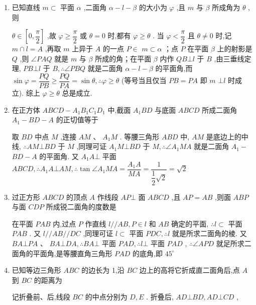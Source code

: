 \begin{enumerate}
    \item 已知直线 $m \subset$ 平面 $\alpha$ ,二面角 $\alpha  - l - \beta$ 的大小为 $\varphi$ ,且 $m$ 与 $\beta$ 所成角为 $\theta$ ,则
    \begin{jieda}
        $\theta  \in  \left\lbrack  {0,\dfrac{\pi }{2}}\right\rbrack$ ,故 $\varphi  \geq  \dfrac{\pi }{2}$ 或 $\theta  = 0$ 时,都有 $\varphi  \geq  \theta$ . 当 $\varphi  < \dfrac{\pi }{2}$ 且 $\theta  \neq  0$ 时,记 $m \cap  l = A$ ,再取 $m$ 上异于 $A$ 的一点 $P \in$  $m \subset  \alpha$ ；点 $P$ 在平面 $\beta$ 上的射影是 $Q$ ,则 $\angle {PAQ}$ 就是 $m$ 与 $\beta$ 所成的角；在平面 $\beta$ 内作 ${QB}\bot l$ 于 $B$ ,由三垂线定理, ${PB}\bot l$ 于 $B,\therefore \angle {PBQ}$ 就是二面角 $\alpha  - l - \beta$ 的平面角,而 $\sin \varphi  = \dfrac{PQ}{PB} \geq  \dfrac{PQ}{PA} = \sin \theta ,\therefore \varphi  \geq  \theta$ (等号当且仅当 ${PB} = {PA}$ 即 $m$  $\bot  l$ 时成立). 综上 $\varphi  \geq  \theta$ 总是成立.
    \end{jieda}
    \item 在正方体 ${ABCD} - {A}_{1}{B}_{1}{C}_{1}{D}_{1}$ 中,截面 ${A}_{1}{BD}$ 与底面 ${ABCD}$ 所成二面角 ${A}_{1} - {BD} - A$ 的正切值等于
    \begin{jieda}
        取 ${BD}$ 中点 $M$ ,连接 ${AM}\text{ 、 }{A}_{1}M$ . 等腰三角形 ${ABD}$ 中, ${AM}$ 是底边上的中线, $\therefore {AM}\bot {BD}$ 于 $M$ ,同理可证 ${A}_{1}M\bot {BD}$ 于 $M,\therefore \angle {A}_{1}{MA}$ 就是二面角 ${A}_{1} -$  ${BD} - A$ 的平面角. 又 ${A}_{1}A \bot$ 平面 ${ABCD},\therefore {A}_{1}A \bot  {AM},\therefore \tan \angle {A}_{1}{MA} = \dfrac{{A}_{1}A}{MA} = \dfrac{1}{\dfrac{1}{2}\sqrt{2}} = \sqrt{2}$
    \end{jieda}
    \item 过正方形 ${ABCD}$ 的顶点 $A$ 作线段 ${AP} \bot$ 面 ${ABCD}$ ,且 ${AP} = {AB}$ ,则面 ${ABP}$ 与面 ${CDP}$ 所成锐二面角的度数是
    \begin{jieda}
        在平面 ${PAB}$ 内,过点 $P$ 作直线 $l//{AB},P \in  l$ 和 ${AB}$ 确定的平面, $\therefore l \subset$ 平面 ${PAB}$ . 又 $l//{AB}//{DC}$ ,同理可证 $l \subset$ 平面 ${PDC},\therefore l$ 就是所求二面角的棱. 又 ${BA} \bot  {PA}\text{ 、 }{BA} \bot  {DA},\therefore {BA} \bot$ 平面 ${PAD},\therefore l \bot$ 平面 ${PAD}$ , $\therefore \angle {APD}$ 就足所求二面角的平面角,是等腰直角三角形 ${PAD}$ 的底角,即 ${45}^{ \circ  }$
    \end{jieda}
    \item 已知等边三角形 ${ABC}$ 的边长为 1,沿 ${BC}$ 边上的高将它折成直二面角后,点 $A$ 到 ${BC}$ 的距离为 
    \begin{jieda}
        记折叠前、后,线段 ${BC}$ 的中点分别为 $D,E$ . 折叠后, ${AD}\bot {BD},{AD}\bot {CD}$ ,
        

\end{jieda}
\end{enumerate}
